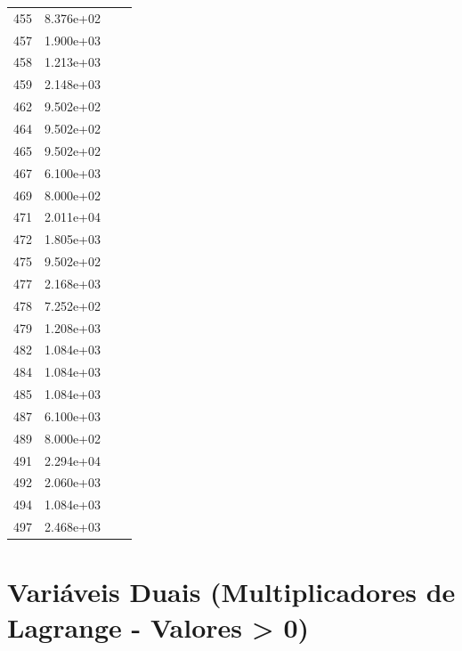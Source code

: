 \documentclass[12pt]{article}
\begin{document}
\begin{longtable}{@{}cccc@{}}
455 & 8.376e+02 &  &  \\
457 & 1.900e+03 &  &  \\
458 & 1.213e+03 &  &  \\
459 & 2.148e+03 &  &  \\
462 & 9.502e+02 &  &  \\
464 & 9.502e+02 &  &  \\
465 & 9.502e+02 &  &  \\
467 & 6.100e+03 &  &  \\
469 & 8.000e+02 &  &  \\
471 & 2.011e+04 &  &  \\
472 & 1.805e+03 &  &  \\
475 & 9.502e+02 &  &  \\
477 & 2.168e+03 &  &  \\
478 & 7.252e+02 &  &  \\
479 & 1.208e+03 &  &  \\
482 & 1.084e+03 &  &  \\
484 & 1.084e+03 &  &  \\
485 & 1.084e+03 &  &  \\
487 & 6.100e+03 &  &  \\
489 & 8.000e+02 &  &  \\
491 & 2.294e+04 &  &  \\
492 & 2.060e+03 &  &  \\
494 & 1.084e+03 &  &  \\
497 & 2.468e+03 &  &  \\

\bottomrule
\end{longtable}


\section{Variáveis Duais (Multiplicadores de Lagrange - Valores > 0)}
\end{document}
